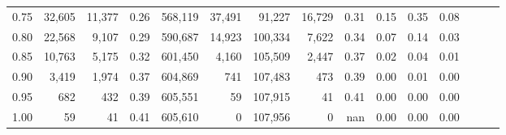 \begin{tabular}{rrrrrrrrrrrrrrr}
0.75 &  32,605 &  11,377 &  0.26 &  568,119 &   37,491 &   91,227 &   16,729 &  0.31 &  0.15 &  0.35 &      0.08 \\
0.80 &  22,568 &   9,107 &  0.29 &  590,687 &   14,923 &  100,334 &    7,622 &  0.34 &  0.07 &  0.14 &      0.03 \\
0.85 &  10,763 &   5,175 &  0.32 &  601,450 &    4,160 &  105,509 &    2,447 &  0.37 &  0.02 &  0.04 &      0.01 \\
0.90 &   3,419 &   1,974 &  0.37 &  604,869 &      741 &  107,483 &      473 &  0.39 &  0.00 &  0.01 &      0.00 \\
0.95 &     682 &     432 &  0.39 &  605,551 &       59 &  107,915 &       41 &  0.41 &  0.00 &  0.00 &      0.00 \\
1.00 &      59 &      41 &  0.41 &  605,610 &        0 &  107,956 &        0 &   nan &  0.00 &  0.00 &      0.00 \\
\bottomrule
\end{tabular}
